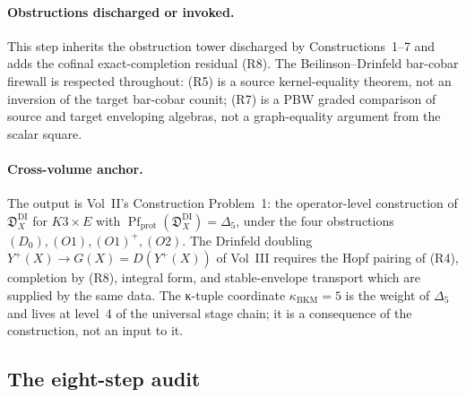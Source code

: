 \paragraph{Obstructions discharged or invoked.}
This step inherits the obstruction tower discharged by
Constructions~1--7 and adds the cofinal exact-completion residual
\textup{(R8)}.  The Beilinson--Drinfeld bar-cobar firewall is
respected throughout: \textup{(R5)} is a source kernel-equality
theorem, not an inversion of the target bar-cobar counit;
\textup{(R7)} is a PBW graded comparison of source and target
enveloping algebras, not a graph-equality argument from the scalar
square.

\paragraph{Cross-volume anchor.}  The output is Vol~II's
\cite{ChiralBarCobarVolII} Construction
Problem~1: the operator-level construction of
\(\mathfrak D_X^{\mathrm{DI}}\) for \(K3\times E\) with
\(\operatorname{Pf}_{\mathrm{prot}}(\mathfrak D_X^{\mathrm{DI}})=\Delta_5\), under the
four obstructions \((D_0),(O1),(O1)^+,(O2)\).  The Drinfeld doubling
\(Y^+(X)\to G(X)=D(Y^+(X))\) of Vol~III \cite{CYQGVolIII} requires the Hopf
pairing of \textup{(R4)}, completion by \textup{(R8)}, integral form,
and stable-envelope transport which are supplied by the same
data.  The κ-tuple coordinate \(\kappa_{\mathrm{BKM}}=5\) is the
weight of \(\Delta_5\) and lives at level~4 of the universal stage
chain; it is a consequence of the construction, not an input to it.

\subsection{The eight-step audit}
\label{app:build-audit}

